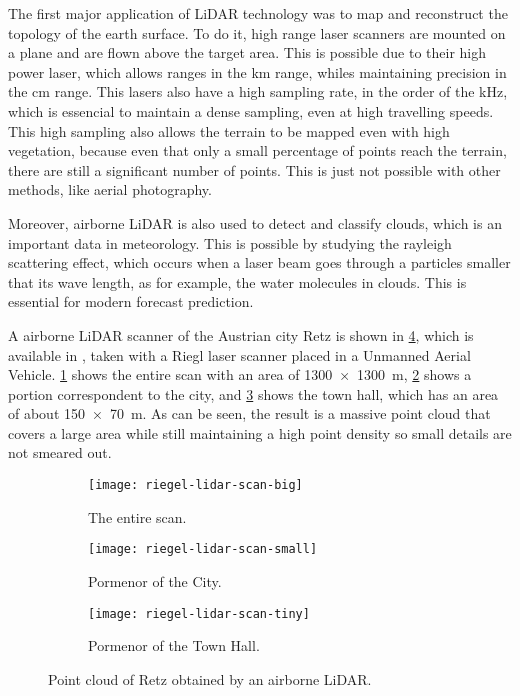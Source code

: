 The first major application of LiDAR technology was to map and reconstruct the topology of the earth surface. To do it, high range laser scanners are mounted on a plane and are flown above the target area. This is possible due to their high power laser, which allows ranges in the \si{\kilo\meter} range, whiles maintaining precision in the \si{\centi\meter} range. This lasers also have a high sampling rate, in the order of the \si{\kilo\hertz}, which is essencial to maintain a dense sampling, even at high travelling speeds. This high sampling also allows the terrain to be mapped even with high vegetation, because even that only a small percentage of points reach the terrain, there are still a significant number of points. This is just not possible with other methods, like aerial photography. 

Moreover, airborne LiDAR is also used to detect and classify clouds, which is an important data in meteorology. This is possible by studying the rayleigh scattering effect, which occurs when a laser beam goes through a particles smaller that its wave length, as for example, the water molecules in clouds.  This is essential for modern forecast prediction.

A airborne LiDAR scanner of the Austrian city Retz is shown in \cref{fig:riegl-lidar-scan}, which is available in \cite{potree-retz}, taken with a Riegl laser scanner placed in a Unmanned Aerial Vehicle. \cref{fig:riegl-lidar-scan-big} shows the entire scan with an area of \SI{1300 x 1300}{\meter}, \cref{fig:riegl-lidar-scan-small} shows a portion correspondent to the city, and \cref{fig:riegl-lidar-scan-tiny} shows the town hall, which has an area of about \SI{150 x 70}{\meter}. As can be seen, the result is a massive point cloud that covers a large area while still maintaining a high point density so small details are not smeared out. 

\begin{figure}[p]
    \centering
    \begin{subfigure}{\textwidth}
        \centering
        \texttt{[image: riegel-lidar-scan-big]}
        \caption{The entire scan.}
        \label{fig:riegl-lidar-scan-big}
    \end{subfigure}

    \centering
    \begin{subfigure}{\textwidth}
        \centering
        \texttt{[image: riegel-lidar-scan-small]}
        \caption{Pormenor of the City.}
        \label{fig:riegl-lidar-scan-small}
    \end{subfigure}

    \centering
    \begin{subfigure}{\textwidth}
        \centering
        \texttt{[image: riegel-lidar-scan-tiny]}
        \caption{Pormenor of the Town Hall.}
        \label{fig:riegl-lidar-scan-tiny}
    \end{subfigure}

    \caption{Point cloud of Retz obtained by an airborne LiDAR.}
    \label{fig:riegl-lidar-scan}
\end{figure}

